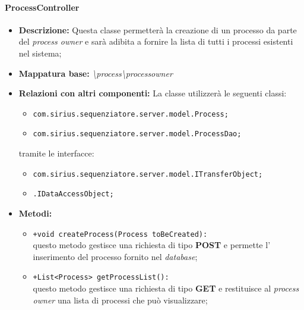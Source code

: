 \paragraph{ProcessController}%
\begin{itemize}
	\item \textbf{Descrizione: } Questa classe permetterà la creazione di un processo da parte del \textit{process owner} e sarà adibita a fornire la lista di tutti i processi esistenti nel sistema;
	\item \textbf{Mappatura base: } \textit{\textbackslash process\textbackslash processowner}
	\item \textbf{Relazioni con altri componenti: }
	La classe utilizzerà le seguenti classi:
	\begin{itemize}
		\item \texttt{com.sirius.sequenziatore.server.model.Process;}
		\item \texttt{com.sirius.sequenziatore.server.model.ProcessDao;}
	\end{itemize}
	tramite le interfacce:
	\begin{itemize}
		\item \texttt{com.sirius.sequenziatore.server.model.ITransferObject;}
		\item \texttt{\sModel .IDataAccessObject;}
	\end{itemize}
	\item \textbf{Metodi: }
				\begin{itemize}
					\item \texttt{+void createProcess(Process toBeCreated):}\\
					questo metodo gestisce una richiesta di tipo \textbf{POST} e permette l' inserimento del processo fornito nel \textit{database};
					\item \texttt{+List<Process> getProcessList():}\\
					 questo metodo gestisce una richiesta di tipo \textbf{GET} e restituisce al \textit{process owner} una lista di processi che può visualizzare;
				\end{itemize}
\end{itemize}
